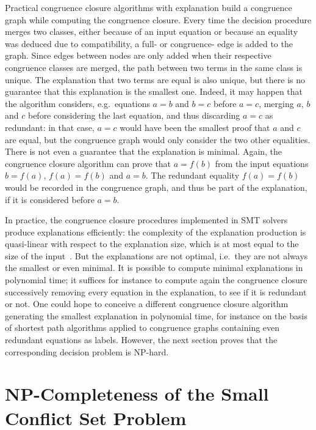 \documentclass[smallextended]{svjour3}
\begin{document}
Practical congruence closure algorithms with explanation build a congruence
graph while computing the congruence closure.  Every time the decision procedure
merges two classes, either because of an input equation or because an equality was deduced due to compatibility,
a full- or congruence- edge is added to the graph.  
Since edges between nodes are only added when their respective congruence classes are merged, 
the path between two terms in the same class is unique.  The
explanation that two terms are equal is also unique, but there is no guarantee
that this explanation is the smallest one.  Indeed, it may happen that the
algorithm considers, e.g.\ equations $a=b$ and $b=c$ before $a=c$, merging $a$,
$b$ and $c$ before considering the last equation, and thus discarding $a=c$ as
redundant: in that case, $a=c$ would have been the smallest proof that $a$ and
$c$ are equal, but the congruence graph would only consider the two other
equalities. 
There is not even a guarantee that the explanation is minimal.
Again, the congruence closure algorithm can prove that $a = f(b)$ from the input
equations $b = f(a)$, $f(a) = f(b)$ and $a = b$.
The redundant equality $f(a) = f(b)$
would be recorded in the congruence graph, and thus be part of the explanation, if it is considered before $a = b$.

In practice, the congruence closure procedures implemented in SMT solvers
produce explanations efficiently: the complexity of the explanation production
is quasi-linear with respect to the explanation size, which is at most equal to
the size of the input~\cite{Nieuwenhuis6}.  But the explanations are not optimal, i.e.\ they are not
always the smallest or even minimal.  It is possible to compute minimal
explanations in polynomial time; it suffices for instance to compute again the
congruence closure successively removing every equation in the explanation, to
see if it is redundant or not.  One could hope to conceive a different
congruence closure algorithm generating the smallest explanation in polynomial
time, for instance on the basis of shortest path algorithms applied to
congruence graphs containing even redundant equations as labels.  However, the
next section proves that the corresponding decision problem is NP-hard.

\section{NP-Completeness of the Small Conflict Set Problem}
\label{sec:npcomplete}
\end{document}
